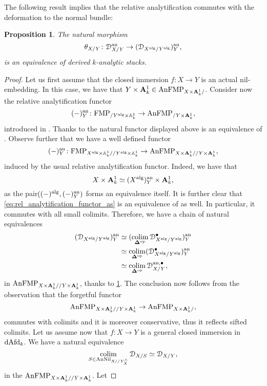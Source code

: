 \documentclass[10pt,a4paper,reqno]{amsart} %
\theoremstyle{plain}
\newtheorem{prop}[thm]{Proposition}
\theoremstyle{definition}
\theoremstyle{remark}
\numberwithin{equation}{section}
\begin{document}
The following result implies that the relative analytification commutes with the deformation to the normal bundle:

\begin{prop} \label{prop:rel_analytification_preserves_the_deformation}
    The natural morphism 
        \[
            \theta_{X/ Y}\colon\mathcal D^\mathrm{an}_{X/Y}\to(\mathcal D_{X^\mathrm{alg}/ Y^\mathrm{alg}})^\mathrm{an}_Y,
        \]
    is an equivalence of derived $k$-analytic stacks.
\end{prop}

\begin{proof} Let us first assume that the closed immersion $f \colon X \to Y$ is an actual nil-embedding. In this case, we have that $Y \times \mathbf A^1_k \in \mathrm{AnFMP}_{X \times \mathbf A^1_k/ }$.
    Consider now the relative analytification functor
        \[
            (-)^\mathrm{an}_Y \colon \mathrm{FMP}_{/ Y^\mathrm{alg} \times \mathbb A^1_k}   \to \mathrm{AnFMP}_{/ Y \times \mathbf A^1_k}, 
        \]
    introduced in \cite[\S 6.1]{Porta_Yu_NQK}. Thanks to \cite[Theorem 6.12]{Porta_Yu_NQK} the natural functor displayed above is an equivalence of \infcats.
    Observe further that we have a well defined functor
        \begin{equation} \label{eq:rel_analytification_functor_as}
            (-)^\mathrm{an}_Y \colon \mathrm{FMP}_{X^\mathrm{alg} \times \mathbb A^1_k/ /Y^\mathrm{alg} \times \mathbb A^1_k} \to \mathrm{AnFMP}_{X \times \mathbf A^1_k/ /Y \times \mathbf A^1_k},
        \end{equation}
    induced by the usual relative analytification functor. Indeed, we have that 
        \[
            X \times \mathbf A^1_k \simeq (X^\mathrm{alg})^\mathrm{an}_Y \times \mathbf A^1_k,   
        \]
    as the pair$((-)^\mathrm{alg}, (-)^\mathrm{an}_Y)$ forms an equivalence itself. It is further clear that \eqref{eq:rel_analytification_functor_as}
    is an equivalence of \infcats as well. In particular, it commutes with all small colimits. Therefore, we have a chain of natural equivalences
        \begin{align*}
            (\mathcal D_{X^\mathrm{alg}/ Y^\mathrm{alg}})^\mathrm{an}_Y & \simeq (\operatorname*{colim}_{\bm{\Delta} ^\mathrm{op}} \mathcal D_{X^\mathrm{alg}/Y^\mathrm{alg}}^\bullet) ^\mathrm{an}_Y \\
                                      & \simeq \operatorname*{colim}_{\bm{\Delta} ^\mathrm{op}}(\mathcal D_{X^\mathrm{alg}/ Y^\mathrm{alg}}^\bullet)^\mathrm{an}_Y \\
                                      & \simeq \operatorname*{colim}_{\bm{\Delta} ^\mathrm{op}} \mathcal D_{X/ Y}^{\mathrm{an}, \bullet},
        \end{align*}
    in $\mathrm{AnFMP}_{X \times \mathbf A^1_k/ / Y\times \mathbf A^1_k}$, thanks to \cref{prop:rel_analytification_preserves_the_deformation}. The conclusion now follows from the observation that the forgetful functor
        \[
            \mathrm{AnFMP}_{X \times \mathbf A^1_k/ /Y \times \mathbf A^1_k} \to \mathrm{AnFMP}_{X \times \mathbf A^1_k/ }  ,
        \]
    commutes with colimits and it is moreover conservative, thus it reflects sifted colimits. Let us assume now that $f \colon X \to Y$
    is a general closed immersion in $\mathrm{dAfd}_k$. We have a natural equivalence
        \[
            \operatorname*{colim}_{S \in \mathrm{AnNil}_{X/ /Y^\wedge_X}} \mathcal D_{X/ S} \simeq \mathcal D_{X/ Y},  
        \]
    in the \infcat $\mathrm{AnFMP}_{X \times \mathbf A^1_k/ /Y \times \mathbf A^1_k}$. Let 
    

\end{proof}
\end{document}
